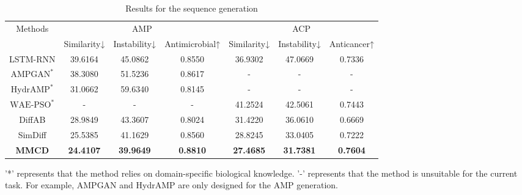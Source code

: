 \documentclass[letterpaper]{article} %
\begin{document}
\begin{table}[ht]
\centering
\begin{threeparttable}[b]
\setlength{\tabcolsep}{10pt}
\begin{tabular}{ccccccc}
\hline
\multirow{2}{*}{Methods} & \multicolumn{3}{c}{AMP}                               & \multicolumn{3}{c}{ACP}                  \\ \cmidrule(r){2-4} \cmidrule(r){5-7}
                         & Similarity↓      & Instability↓     & Antimicrobial↑  & Similarity↓ & Instability↓ & Anticancer↑ \\ \hline
LSTM-RNN                 & 39.6164          & 45.0862          & 0.8550          & 36.9302     & 47.0669      & 0.7336      \\
$\text{AMPGAN}^*$        & 38.3080          & 51.5236          & 0.8617          & -           & -            & -           \\
$\text{HydrAMP}^*$       & 31.0662          & 59.6340          & 0.8145          & -           & -            & -           \\
$\text{WAE-PSO}^*$       & -                & -                & -               & 41.2524     & 42.5061      & 0.7443      \\
DiffAB                   & 28.9849          & 43.3607          & 0.8024          & 31.4220     & 36.0610      & 0.6669      \\
SimDiff                  & 25.5385          & 41.1629          & 0.8560          & 28.8245     & 33.0405      & 0.7222      \\
\textbf{MMCD}            & \textbf{24.4107} & \textbf{39.9649} & \textbf{0.8810} & \textbf{27.4685} & \textbf{31.7381} & \textbf{0.7604}  \\ \hline
\end{tabular}
\begin{tablenotes}
\item '*' represents that the method relies on domain-specific biological knowledge. '-' represents that the method is unsuitable for the current task. For example, AMPGAN and HydrAMP are only designed for the AMP generation.
\end{tablenotes}
\end{threeparttable}
\caption{Results for the sequence generation}
\end{table}
\end{document}

